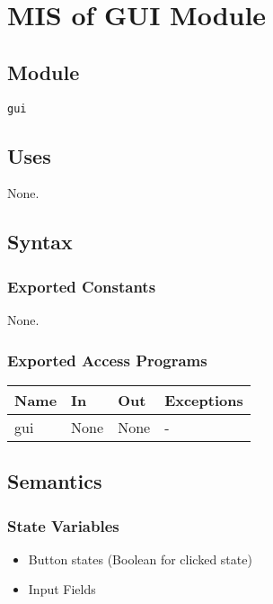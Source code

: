 \documentclass[12pt, titlepage]{article}
\begin{document}
\newpage

\section{MIS of GUI Module} \label{Module_GUI}

\subsection{Module}

\texttt{gui}

\subsection{Uses}

None.

\subsection{Syntax}

\subsubsection{Exported Constants}
None.

\subsubsection{Exported Access Programs}

\begin{center}
\begin{tabular}{p{2cm} p{4cm} p{4cm} p{2cm}}
\hline
\textbf{Name} & \textbf{In} & \textbf{Out} & \textbf{Exceptions} \\
\hline
gui & None & None & - \\
\hline
\end{tabular}
\end{center}

\subsection{Semantics}

\subsubsection{State Variables}

\begin{itemize}
  \item Button states (Boolean for clicked state)
  \item Input Fields
  
\end{itemize}
\end{document}
